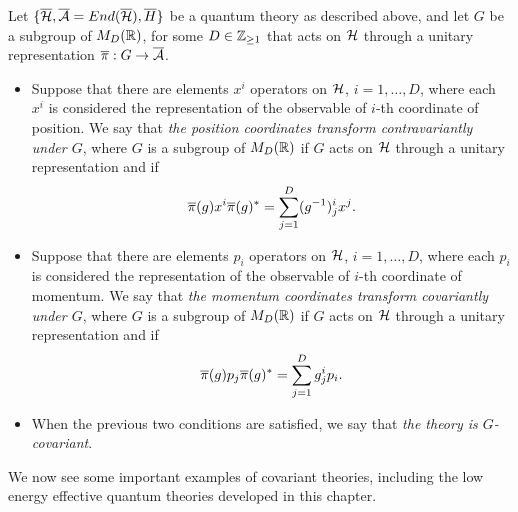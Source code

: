 \begin{definition}\label{definitionGActsCovariantlyOnCoordinates}
Let $\{\overline{\mathcal H}, \overline{\mathcal A} = End(\overline{\mathcal H}), \overline{H}\}$ be a quantum theory as described above, and let $G$ be a subgroup of $M_D(\mathbb{R})$, for some $D \in \mathbb{Z}_{\geq 1}$ that acts on $\mathcal H$ through a unitary representation $\overline{\pi}: G \to \overline{\mathcal A}$.
    \begin{itemize}
        
        \item Suppose that there are elements $x^i$ operators on $\mathcal H$, $i = 1, \dots, D$, where each $x^i$ is considered the representation of the observable of $i$-th coordinate of position. We say that \emph{the position coordinates transform contravariantly under $G$}, where $G$ is a subgroup of $M_D(\mathbb{R})$ if $G$ acts on $\mathcal H$ through a unitary representation  and if 
        \begin{equation}
            \overline{\pi}(g) x^i \overline{\pi}(g)^* = \sum_{j = 1}^D (g^{-1})^i_j x^j.
        \end{equation}
        
        \item Suppose that there are elements $p_i$ operators on $\mathcal H$, $i = 1, \dots, D$, where each $p_i$ is considered the representation of the observable of $i$-th coordinate of momentum. We say that \emph{the momentum coordinates transform covariantly under $G$}, where $G$ is a subgroup of $M_D(\mathbb{R})$ if $G$ acts on $\mathcal H$ through a unitary representation  and if 
        \begin{equation}
            \overline{\pi}(g) p_j \overline{\pi}(g)^* = \sum_{j = 1}^D g^i_j p_i.
        \end{equation}
    
    \item When the previous two conditions are satisfied, we say that \emph{the theory is $G$-covariant}.
    
    \end{itemize}
    \end{definition}

We now see some important examples of covariant theories, including the low energy effective quantum theories developed in this chapter.

